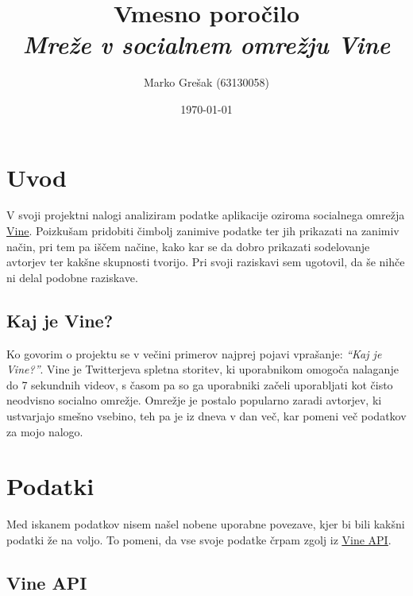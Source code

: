\documentclass[a4paper,11pt]{article}
\title{\huge{Vmesno poročilo} \\ \Large{\em{Mreže v socialnem omrežju Vine}}}
\author{Marko Grešak (63130058)}
\date{\today}
\begin{document}
\maketitle

\section{Uvod}


V svoji projektni nalogi analiziram podatke aplikacije oziroma socialnega omrežja
\href{https://vine.co}{\underline{Vine}}. Poizkušam pridobiti čimbolj zanimive
podatke ter jih prikazati na zanimiv način, pri tem pa iščem načine, kako kar se
da dobro prikazati sodelovanje avtorjev ter kakšne skupnosti tvorijo. Pri svoji
raziskavi sem ugotovil, da še nihče ni delal podobne raziskave.

\subsection{Kaj je Vine?}

Ko govorim o projektu se v večini primerov najprej pojavi vprašanje:
\textit{“Kaj je Vine?”}. Vine je Twitterjeva spletna storitev, ki uporabnikom
omogoča nalaganje do 7 sekundnih videov, s časom pa so ga uporabniki začeli
uporabljati kot čisto neodvisno socialno omrežje. Omrežje je postalo popularno
zaradi avtorjev, ki ustvarjajo smešno vsebino, teh pa je iz dneva v dan več, kar
pomeni več podatkov za mojo nalogo.

\section{Podatki}

Med iskanem podatkov nisem našel nobene uporabne povezave, kjer bi bili kakšni
podatki že na voljo. To pomeni, da vse svoje podatke črpam zgolj iz
\href{https://api.vineapp.com}{\underline{Vine API}}.

\subsection{Vine API}
\end{document}
